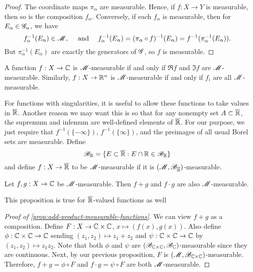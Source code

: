 \documentclass[12pt]{article} %
\begin{document}
\begin{proof}
    The coordinate maps $\pi_\alpha$ are measurable. Hence, if $f : X \to Y$ is measurable, then so is the composition $f_\alpha$. Conversely, if each $f_\alpha$ is measurable, then for $E_\alpha \in \mathscr{G}_\alpha$, we have \[f_\alpha^{-1}(E_\alpha) \in \SM, \ \ \ \ \text{and} \ \ \ \ f_\alpha^{-1}(E_\alpha) = (\pi_\alpha \circ f)^{-1}(E_\alpha) = f^{-1}(\pi_\alpha^{-1}(E_\alpha)).\] But $\pi_\alpha^{-1}(E_\alpha)$ are exactly the generators of $\mathscr{G}$, so $f$ is measurable.
\end{proof}

\begin{corollary}
    A function $f : X \to \mathbb{C}$ is $\mathscr{M}$-measurable if and only if $\Re f$ and $\Im f$ are $\mathscr{M}$-measurable. Similarly, $f : X \to \mathbb{R}^n$ is $\mathscr{M}$-measurable if and only if $f_i$ are all $\mathscr{M}$-measurable.
\end{corollary}

For functions with singularities, it is useful to allow these functions to take values in $\overline{\mathbb{R}}$. Another reason we may want this is so that for any nonempty set $A \subset \overline{\mathbb{R}}$, the supremum and infemum are well-defined elements of $\overline{\mathbb{R}}$. For our purpose, we just require that $f^{-1}(\{-\infty\})$, $f^{-1}(\{\infty\})$, and the preimages of all usual Borel sets are measurable. Define \[\mathscr{B}_{\mathbb{R}} = \{E \subset \overline{\mathbb{R}} : E \cap \mathbb{R} \in \mathscr{B}_{\mathbb{R}}\}\] and define $f : X \to \overline{\mathbb{R}}$ to be $\mathscr{M}$-measurable if it is $(\mathscr{M}, \mathscr{B}_{\overline{\mathbb{R}}})$-measurable. 

\begin{proposition}\label{prop:add-product-measurable-functions}
    Let $f, g : X \to \mathbb{C}$ be $\mathscr{M}$-measurable. Then $f + g$ and $f\cdot g$ are also $\mathscr{M}$-measurable.
\end{proposition}

\begin{remark}
    This proposition is true for $\overline{\mathbb{R}}$-valued functions as well
\end{remark}

\begin{proof}[Proof of \cref{prop:add-product-measurable-functions}]
    We can view $f + g$ as a composition. Define $F : X \to \mathbb{C} \times \mathbb{C}$, $x \mapsto (f(x), g(x))$. Also define $\phi : \mathbb{C} \times \mathbb{C} \to \mathbb{C}$ sending $(z_1, z_2) \mapsto z_1 + z_2$ and $\psi : \mathbb{C} \times \mathbb{C} \to \mathbb{C}$ by $(z_1, z_2) \mapsto z_1 z_2$. Note that both $\phi$ and $\psi$ are $(\mathscr{B}_{\mathbb{C} \times \mathbb{C}}, \mathscr{B}_{\mathbb{C}})$-measurable since they are continuous. Next, by our previous proposition, $F$ is $(\mathscr{M}, \mathscr{B}_{\mathbb{C} \times \mathbb{C}})$-measurable. Therefore, $f + g = \phi \circ F$ and $f \cdot g = \psi \circ F$ are both $\mathscr{M}$-measurable.
\end{proof}
\end{document}
